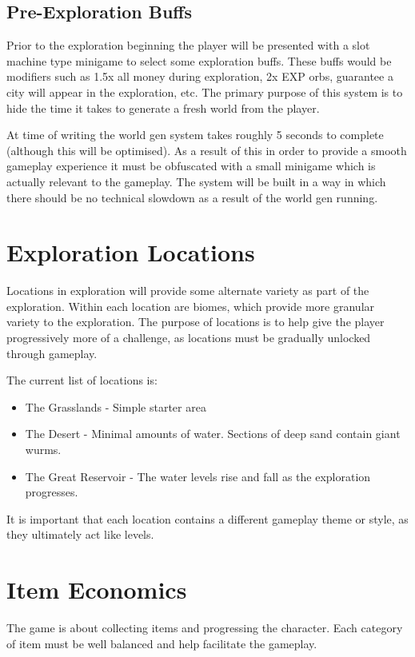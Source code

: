 \documentclass[a4paper]{scrreprt}
\begin{document}
\subsection{Pre-Exploration Buffs}
Prior to the exploration beginning the player will be presented with a slot machine type minigame to select some exploration buffs.
These buffs would be modifiers such as 1.5x all money during exploration, 2x EXP orbs, guarantee a city will appear in the exploration, etc.
The primary purpose of this system is to hide the time it takes to generate a fresh world from the player.

At time of writing the world gen system takes roughly 5 seconds to complete (although this will be optimised).
As a result of this in order to provide a smooth gameplay experience it must be obfuscated with a small minigame which is actually relevant to the gameplay.
The system will be built in a way in which there should be no technical slowdown as a result of the world gen running.

\section{Exploration Locations}
Locations in exploration will provide some alternate variety as part of the exploration.
Within each location are biomes, which provide more granular variety to the exploration.
The purpose of locations is to help give the player progressively more of a challenge, as locations must be gradually unlocked through gameplay.

The current list of locations is:

    \begin{itemize}
        \item The Grasslands - Simple starter area
        \item The Desert - Minimal amounts of water. Sections of deep sand contain giant wurms.
        \item The Great Reservoir - The water levels rise and fall as the exploration progresses.
    \end{itemize}

It is important that each location contains a different gameplay theme or style, as they ultimately act like levels.

\section{Item Economics}
The game is about collecting items and progressing the character.
Each category of item must be well balanced and help facilitate the gameplay.
\end{document}
